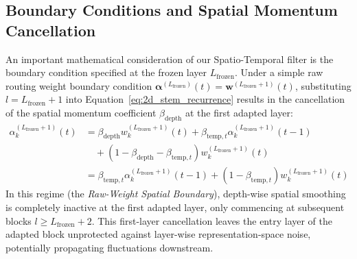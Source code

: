 \subsection{Boundary Conditions and Spatial Momentum Cancellation}
An important mathematical consideration of our Spatio-Temporal filter is the boundary condition specified at the frozen layer $L_{\text{frozen}}$. Under a simple raw routing weight boundary condition $\boldsymbol{\alpha}^{(L_{\text{frozen}})}(t) = \mathbf{w}^{(L_{\text{frozen}}+1)}(t)$, substituting $l = L_{\text{frozen}} + 1$ into Equation~\ref{eq:2d_stem_recurrence} results in the cancellation of the spatial momentum coefficient $\beta_{\text{depth}}$ at the first adapted layer:
\begin{align}
    \alpha_k^{(L_{\text{frozen}}+1)}(t) &= \beta_{\text{depth}} w_k^{(L_{\text{frozen}}+1)}(t) + \beta_{\text{temp}, t} \alpha_k^{(L_{\text{frozen}}+1)}(t-1) \nonumber \\
    &\quad + \left(1 - \beta_{\text{depth}} - \beta_{\text{temp}, t}\right) w_k^{(L_{\text{frozen}}+1)}(t) \nonumber \\
    &= \beta_{\text{temp}, t} \alpha_k^{(L_{\text{frozen}}+1)}(t-1) + \left(1 - \beta_{\text{temp}, t}\right) w_k^{(L_{\text{frozen}}+1)}(t)
\end{align}
In this regime (the \emph{Raw-Weight Spatial Boundary}), depth-wise spatial smoothing is completely inactive at the first adapted layer, only commencing at subsequent blocks $l \ge L_{\text{frozen}} + 2$. This first-layer cancellation leaves the entry layer of the adapted block unprotected against layer-wise representation-space noise, potentially propagating fluctuations downstream.

